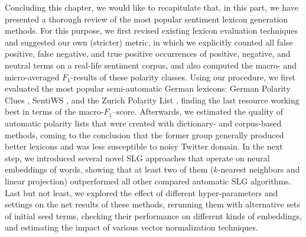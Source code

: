 \documentclass[11pt]{article}
\newcommand{\F}[0]{$F_1$}
\renewcommand{\cite}{\citep}
\begin{document}
Concluding this chapter, we would like to recapitulate that, in this
part, we have presented a thorough review of the most popular
sentiment lexicon generation methods.  For this purpose, we first
revised existing lexicon evaluation techniques and suggested our own
(stricter) metric, in which we explicitly counted all false positive,
false negative, and true positive occurrences of positive, negative,
and neutral terms on a real-life sentiment corpus, and also computed
the macro- and micro-averaged \F-results of these polarity classes.
Using our procedure, we first evaluated the most popular
semi-automatic German lexicons: German Polarity Clues
\cite{Waltinger:10}, SentiWS \cite{Remus:10}, and the Zurich Polarity
List \cite{Clematide:10}, finding the last resource working best in
terms of the macro-\F--score.  Afterwards, we estimated the quality of
automatic polarity lists that were created with dictionary- and
corpus-based methods, coming to the conclusion that the former group
generally produced better lexicons and was less susceptible to noisy
Twitter domain.  In the next step, we introduced several novel SLG
approaches that operate on neural embeddings of words, showing that at
least two of them ($k$-nearest neighbors and linear projection)
outperformed all other compared automatic SLG algorithms.  Last but
not least, we explored the effect of different hyper-parameters and
settings on the net results of these methods, rerunning them with
alternative sets of initial seed terms, checking their performance on
different kinds of embeddings, and estimating the impact of various
vector normalization techniques.
\end{document}
